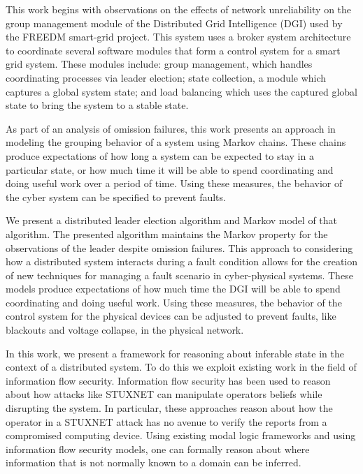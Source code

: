 This work begins with observations on the effects of network unreliability on the group management module of the Distributed Grid Intelligence (DGI) used by the FREEDM smart-grid project.
This system uses a broker system architecture to coordinate several software modules that form a control system for a smart grid system.
These modules include: group management, which handles coordinating processes via leader election; state collection, a module which captures a global system state; and load balancing which uses the captured global state to bring the system to a stable state.

As part of an analysis of omission failures, this work presents an approach in modeling the grouping behavior of a system using Markov chains.
These chains produce expectations of how long a system can be expected to stay in a particular state, or how much time it will be able to spend coordinating and doing useful work over a period of time.
Using these measures, the behavior of the cyber system can be specified to prevent faults.

We present a distributed leader election algorithm and Markov model of that algorithm.
The presented algorithm maintains the Markov property for the observations of the leader despite omission\cite{OMISSIONFAILURES} failures.
This approach to considering how a distributed system interacts during a fault condition allows for the creation of new techniques for managing a fault scenario in cyber-physical systems.
These models produce expectations of how much time the DGI will be able to spend coordinating and doing useful work.
Using these measures, the behavior of the control system for the physical devices can be adjusted to prevent faults, like blackouts and voltage collapse, in the physical network.


In this work, we present a framework for reasoning about inferable state in the context of a distributed system. To do this we exploit existing work in the field of information flow security. Information flow security has been used to reason about how attacks like STUXNET can manipulate operators beliefs while disrupting the system\cite{STUXNET}. In particular, these approaches reason about how the operator in a STUXNET attack has no avenue to verify the reports from a compromised computing device. Using existing modal logic frameworks and using information flow security models\cite{Howser2012}\cite{STUXNET}\cite{Howser2013}, one can formally reason about where information that is not normally known to a domain can be inferred.

